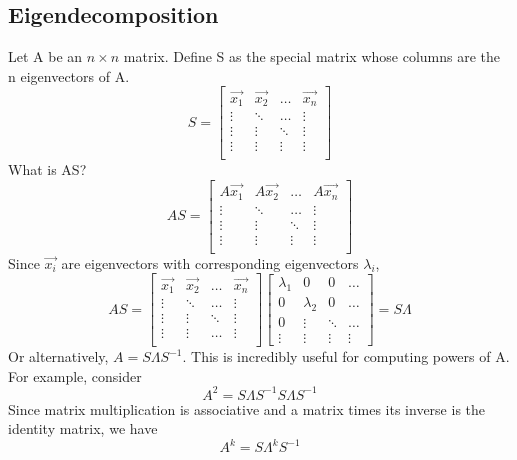 \documentclass[11pt]{article}
\begin{document}
\subsection{Eigendecomposition}
Let A be an $n \times n$ matrix. Define S as the special matrix whose columns are the n eigenvectors of A.
\begin{equation}
S = \begin{bmatrix}
\vec{x_1} & \vec{x_2} &  \ldots & \vec{x_n} \\
\vdots & \ddots & \ldots &\vdots \\
\vdots & \vdots & \ddots &\vdots \\
\vdots & \vdots & \vdots &\vdots \\
\end{bmatrix}
\end{equation}
What is AS?
\begin{equation}
AS = \begin{bmatrix}
A\vec{x_1} & A\vec{x_2} & \ldots & A\vec{x_n} \\
\vdots & \ddots & \ldots &\vdots \\
\vdots & \vdots & \ddots &\vdots \\
\vdots & \vdots & \vdots &\vdots \\
\end{bmatrix}
\end{equation}
Since $\vec{x_i}$ are eigenvectors with corresponding eigenvectors $\lambda_i$,
\begin{equation}
AS = \begin{bmatrix}
\vec{x_1} & \vec{x_2} &  \ldots & \vec{x_n} \\
\vdots & \ddots & \ldots &\vdots \\
\vdots & \vdots & \ddots &\vdots \\
\vdots & \vdots & \ldots &\vdots \\
\end{bmatrix}
 \begin{bmatrix}
\lambda_1 & 0 & 0 & \ldots \\
0 & \lambda_2 & 0 & \ldots \\
0 & \vdots & \ddots & \ldots  \\
\vdots & \vdots & \vdots & \vdots 
\end{bmatrix}
= S\Lambda
\end{equation}
Or alternatively, $A = S\Lambda S^{-1}$. This is incredibly useful for computing powers of A. For example, consider 
$$A^2 =S\Lambda S^{-1}S\Lambda S^{-1}$$
Since matrix multiplication is associative and a matrix times its inverse is the identity matrix, we have
\begin{equation}
A^k = S \Lambda^k S^{-1}
\end{equation}
\end{document}
